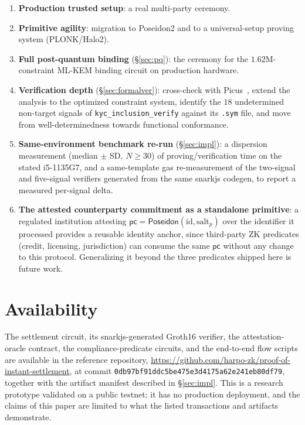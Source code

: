 \documentclass[11pt]{article}
\newcommand{\Poseidon}{\ensuremath{\mathsf{Poseidon}}}
\newcommand{\code}[1]{\texttt{#1}}
\begin{document}
\begin{enumerate}
construction's commitment as an input to a private asset transfer, which would
turn the architectural positioning of \S\ref{sec:relatedwork} into a
demonstrated one.
\item \textbf{Production trusted setup}: a real multi-party ceremony.
\item \textbf{Primitive agility}: migration to Poseidon2 and to a universal-setup
proving system (PLONK/Halo2).
\item \textbf{Full post-quantum binding} (\S\ref{sec:pq}): the ceremony for the
$1.62$M-constraint ML-KEM binding circuit on production hardware.
\item \textbf{Verification depth} (\S\ref{sec:formalver}): cross-check with
Picus~\cite{picus}, extend the analysis to the optimized constraint system,
identify the $18$ undetermined non-target signals of \code{kyc\_inclusion\_verify}
against its \code{.sym} file, and move from well-determinedness towards
functional conformance.
\item \textbf{Same-environment benchmark re-run} (\S\ref{sec:impl}): a
dispersion measurement (median $\pm$ SD, $N\geq30$) of proving/verification time
on the stated i5-1135G7, and a same-template gas re-measurement of the
two-signal and five-signal verifiers generated from the same snarkjs codegen, to
report a measured per-signal delta.
\item \textbf{The attested counterparty commitment as a standalone primitive}: a
regulated institution attesting $\mathsf{pc}=\Poseidon(\text{id},\text{salt}_p)$
over the identifier it processed provides a reusable identity anchor, since
third-party ZK predicates (credit, licensing, jurisdiction) can consume the same
$\mathsf{pc}$ without any change to this protocol. Generalizing it beyond the
three predicates shipped here is future work.
\end{enumerate}

\section*{Availability}
The settlement circuit, its snarkjs-generated Groth16 verifier, the
attestation-oracle contract, the compliance-predicate circuits, and the
end-to-end flow scripts are available in the reference repository,
\url{https://github.com/harpo-zk/proof-of-instant-settlement}, at commit
\code{0db97bf91ddc\allowbreak 5be475e3d4\allowbreak 175a62e241\allowbreak eb80df79}, together with the artifact
manifest described in \S\ref{sec:impl}. This is a research prototype validated
on a public testnet; it has no production deployment, and the claims of this
paper are limited to what the listed transactions and artifacts demonstrate.
\end{document}
